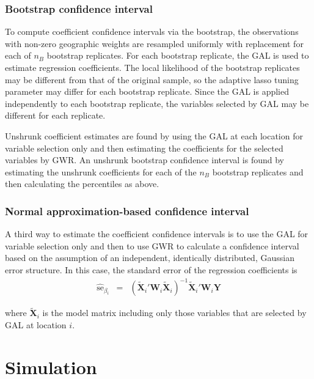 \documentclass[authoryear, review, 11pt]{elsarticle}
\begin{document}
	 	\subsubsection{Bootstrap confidence interval}
		To compute coefficient confidence intervals via the bootstrap, the observations with non-zero geographic weights are resampled uniformly with replacement for each of $n_B$ bootstrap replicates. For each bootstrap replicate, the GAL is used to estimate regression coefficients. The local likelihood of the bootstrap replicates may be different from that of the original sample, so the adaptive lasso tuning parameter may differ for each bootstrap replicate. Since the GAL is applied independently to each bootstrap replicate, the variables selected by GAL may be different for each replicate.
	
		 Unshrunk coefficient estimates are found by using the GAL at each location for variable selection only and then estimating the coefficients for the selected variables by GWR. An unshrunk bootstrap confidence interval is found by estimating the unshrunk coefficients for each of the $n_B$ bootstrap replicates and then calculating the percentiles as above.\\
	 
		
	 	\subsubsection{Normal approximation-based confidence interval}
		A third way to estimate the coefficient confidence intervals is to use the GAL for variable selection only and then to use GWR to calculate a confidence interval based on the assumption of an independent, identically distributed, Gaussian error structure. In this case, the standard error of the regression coefficients is 
		\begin{eqnarray}
			\hat{\mbox{se}}_{\beta_i} &=& \left( \tilde{\bm{X}}_i'\bm{W}_i \tilde{\bm{X}}_i \right)^{-1}  \tilde{\bm{X}}_i'\bm{W}_i\bm{Y}
		\end{eqnarray}
	
		where $\tilde{\bm{X}}_i$ is the model matrix including only those variables that are selected by GAL at location $i$.



\section{Simulation}
\end{document}
